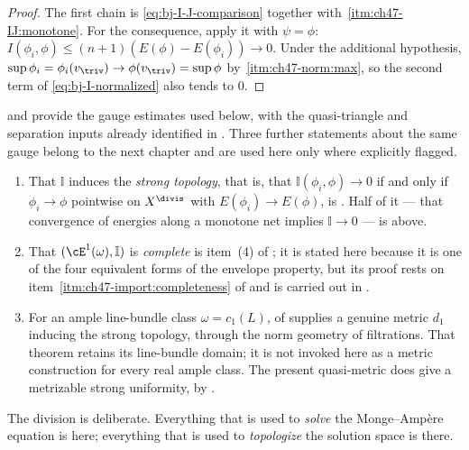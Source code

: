 \begin{proof}
The first chain is \eqref{eq:bj-I-J-comparison} together with
\,\cref{itm:ch47-IJ:monotone}.  For the
consequence, apply it with $\psi=\phi$:
$I(\phi_i,\phi)\le(n+1)(E(\phi)-E(\phi_i))\to0$.  Under the additional
hypothesis, $\sup\phi_i=\phi_i(v_{\triv})\to\phi(v_{\triv})=\sup\phi$ by
\,\cref{itm:ch47-norm:max}, so the
second term of \eqref{eq:bj-I-normalized} also tends to $0$.
\end{proof}

\begin{remark}
\label{rem:ch47-strong-deferred}
 and  provide the
gauge estimates used below, with the quasi-triangle and separation inputs
already identified in .  Three further statements about the same
gauge belong to the next chapter and are used here only where explicitly
flagged.
\begin{enumerate}
\item\label{itm:ch47-strong:topology}
      That $\mathbb I$ induces the \emph{strong topology}, that is, that
      $\mathbb I(\phi_i,\phi)\to0$ if and only if $\phi_i\to\phi$
      pointwise on $X^{\divis}$ with $E(\phi_i)\to E(\phi)$, is
      .  Half of it ---
      that convergence of energies along a monotone net implies
      $\mathbb I\to0$ --- is  above.
\item\label{itm:ch47-strong:complete}
      That $(\cE^1(\omega),\mathbb I)$ is \emph{complete} is
      item~(4) of ; it is stated here
      because it is one of the four equivalent forms of the envelope
      property, but its proof rests on
      item~\cref{itm:ch47-import:completeness} of
       and is carried out in
      .
\item\label{itm:ch47-strong:d1}
      For an ample line-bundle class $\omega=c_1(L)$,
       of
       supplies a genuine metric $d_1$ inducing
      the strong topology, through the norm geometry of filtrations.
      That theorem retains its line-bundle domain; it is not invoked
      here as a metric construction for every real ample class.
      The present quasi-metric does give a metrizable strong uniformity,
      by \cite[Theorem~12.4]{BJ22}.
\end{enumerate}
The division is deliberate.  Everything that is used to \emph{solve} the
Monge--Amp\`ere equation is here; everything that is used to \emph{topologize}
the solution space is there.
\end{remark}

